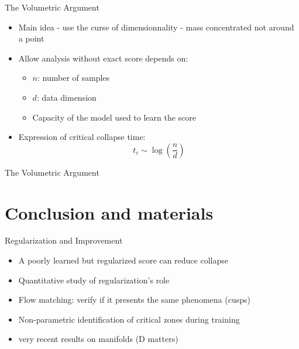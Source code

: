 \documentclass[aspectratio=169]{beamer}
\begin{document}
\begin{frame}{The Volumetric Argument}
    \begin{itemize}
        \item Main idea - use the curse of dimensionnality - mass concentrated not around a point
    
        \item Allow analysis without exact score depends on:
        \begin{itemize}
            \item $n$: number of samples
            \item $d$: data dimension
            \item Capacity of the model used to learn the score
        \end{itemize}
        \item Expression of critical collapse time:
        \begin{equation}
            t_c \sim \log\left(\frac{n}{d}\right)
        \end{equation}
    \end{itemize}
\end{frame}

\begin{frame}{The Volumetric Argument}
    
    \begin{center}
    \end{center}
\end{frame}










\section{Conclusion and materials}
\begin{frame}{Regularization and Improvement}
    \begin{itemize}
        \item A poorly learned but regularized score can reduce collapse
        \item Quantitative study of regularization's role
        \item Flow matching: verify if it presents the same phenomena (cusps)
        \item Non-parametric identification of critical zones during training
        \item very recent results on manifolds (D matters)
    \end{itemize}
\end{frame}
\end{document}
